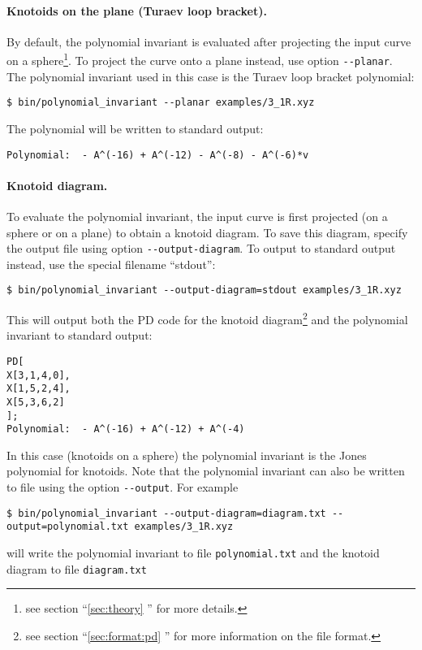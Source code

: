\paragraph{Knotoids on the plane (Turaev loop bracket).}
By default, the polynomial invariant is evaluated after projecting the input curve on a sphere\footnote{see section ``\ref{sec:theory} '' for more details.}. To project the curve onto a plane instead, use option \lstinline{--planar}. The polynomial invariant used in this case is the Turaev loop bracket polynomial:
\begin{lstlisting}
$ bin/polynomial_invariant --planar examples/3_1R.xyz
\end{lstlisting}
The polynomial will be written to standard output:
\begin{lstlisting}
Polynomial:  - A^(-16) + A^(-12) - A^(-8) - A^(-6)*v
\end{lstlisting}

\paragraph{Knotoid diagram.}
To evaluate the polynomial invariant, the input curve is first projected (on a sphere or on a plane) to obtain a knotoid diagram. To save this diagram, specify the output file using option \lstinline{--output-diagram}. To output to standard output instead, use the special filename ``stdout'': 
\begin{lstlisting}
$ bin/polynomial_invariant --output-diagram=stdout examples/3_1R.xyz
\end{lstlisting}
This will output both the PD code for the knotoid diagram\footnote{see section ``\ref{sec:format:pd} '' for more information on the file format.} and the polynomial invariant to standard output:
\begin{lstlisting}
PD[
X[3,1,4,0],
X[1,5,2,4],
X[5,3,6,2]
];
Polynomial:  - A^(-16) + A^(-12) + A^(-4)
\end{lstlisting}
In this case (knotoids on a sphere) the polynomial invariant is the Jones polynomial for knotoids.
Note that the polynomial invariant can also be written to file using the option \lstinline{--output}. For example
\begin{lstlisting}
$ bin/polynomial_invariant --output-diagram=diagram.txt --output=polynomial.txt examples/3_1R.xyz
\end{lstlisting}
will write the polynomial invariant to file \lstinline{polynomial.txt} and the knotoid diagram to file \lstinline{diagram.txt}

